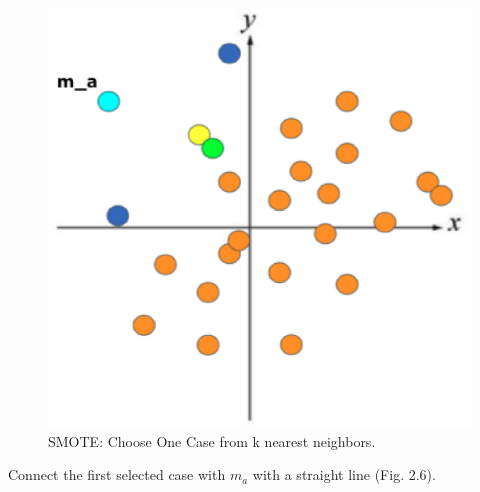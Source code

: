 \begin{center}
    \begin{figure}[ht]
        \caption{SMOTE: Choose One Case from k nearest neighbors.}
        \label{tab:team-rating-features}
        \begin{center}
            \includegraphics[scale=0.6]{image/smote4.eps}
        \end{center}
    \end{figure}
\end{center}

\clearpage
Connect the first selected case with $m_a$ with a straight line (Fig. 2.6).

